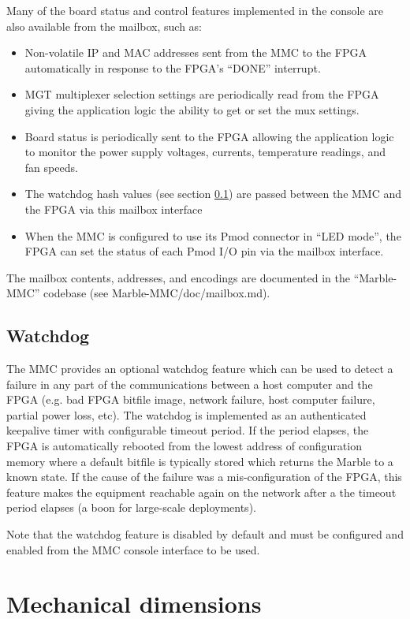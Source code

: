 \documentclass[12pt,oneside,a4]{article}
\begin{document}
  Many of the board status and control features implemented in the console are also available from the mailbox, such as:
\begin{itemize}
	\item Non-volatile IP and MAC addresses sent from the MMC to the FPGA automatically in response to the FPGA's ``DONE'' interrupt.
	\item MGT multiplexer selection settings are periodically read from the FPGA giving the application logic the ability to get or set the mux settings.
	\item Board status is periodically sent to the FPGA allowing the application logic to monitor the power supply voltages, currents, temperature readings, and fan speeds.
	\item The watchdog hash values (see section \ref{sec:MMC:Watchdog}) are passed between the MMC and the FPGA via this mailbox interface
	\item When the MMC is configured to use its Pmod connector in ``LED mode'', the FPGA can set the status of each Pmod I/O pin via the mailbox interface.
\end{itemize}

  The mailbox contents, addresses, and encodings are documented in the ``Marble-MMC'' codebase (see Marble-MMC/doc/mailbox.md).

\subsection{Watchdog}\label{sec:MMC:Watchdog}
The MMC provides an optional watchdog feature which can be used to detect a failure in any part of the communications between a host computer
and the FPGA (e.g. bad FPGA bitfile image, network failure, host computer failure, partial power loss, etc).  The watchdog is implemented
as an authenticated keepalive timer with configurable timeout period.  If the period elapses, the FPGA is automatically rebooted from the
lowest address of configuration memory where a default bitfile is typically stored which returns the Marble to a known state.  If the cause
of the failure was a mis-configuration of the FPGA, this feature makes the equipment reachable again on the network after a the timeout
period elapses (a boon for large-scale deployments).

Note that the watchdog feature is disabled by default and must be configured and enabled from the MMC console interface to be used.

\section{Mechanical dimensions}
\end{document}
